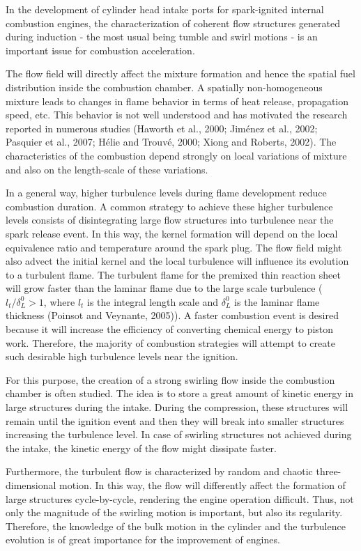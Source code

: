 \documentclass[10pt,fleqn,a4paper]{article}
\begin{document}
In the development of cylinder head intake ports for spark-ignited internal combustion engines, the characterization of coherent flow structures generated during induction - the most usual being tumble and swirl motions - is an important issue for combustion acceleration. 

The flow field will directly affect the mixture formation and hence the spatial fuel distribution inside the combustion chamber. A spatially non-homogeneous mixture leads to changes in flame behavior in terms of heat release, propagation speed, etc. This behavior is not well understood and has motivated the research reported in numerous studies (Haworth et al., 2000; Jim\'{e}nez et al., 2002; Pasquier et al., 2007; H\'{e}lie and Trouv\'{e}, 2000; Xiong and Roberts, 2002). The characteristics of the combustion depend strongly on local variations of mixture and also on the length-scale of these variations.

In a general way, higher turbulence levels during flame development reduce combustion duration.  A common strategy to achieve these higher turbulence levels consists of disintegrating large flow structures into turbulence near the spark release event. In this way, the kernel formation will depend on the local equivalence ratio and temperature around the spark plug. The flow field might also advect the initial kernel and the local turbulence will influence its evolution to a turbulent flame. The turbulent flame for the premixed thin reaction sheet will grow faster than the laminar flame due to the large scale turbulence ($l_{t}/\delta^{0}_{L} > 1$, where $l_{t}$ is the integral length scale and $\delta^{0}_{L}$ is the laminar flame thickness (Poinsot and Veynante, 2005)). A faster combustion event is desired because it will increase the efficiency of converting chemical energy to piston work. Therefore, the majority of combustion strategies will attempt to create such desirable high turbulence levels near the ignition.

For this purpose, the creation of a strong swirling flow inside the combustion chamber is often studied. The idea is to store a great amount of kinetic energy in large structures during the intake. During the compression, these structures will remain until the ignition event and then they will break into smaller structures increasing the turbulence level. In case of swirling structures not achieved during the intake, the kinetic energy of the flow might dissipate faster.

Furthermore, the turbulent flow is characterized by random and chaotic three-dimensional motion. In this way, the flow will differently affect the formation of large structures cycle-by-cycle, rendering the engine operation difficult. Thus, not only the magnitude of the swirling motion is important, but also its regularity. Therefore, the knowledge of the bulk motion in the cylinder and the turbulence evolution is of great importance for the improvement of engines.
\end{document}
